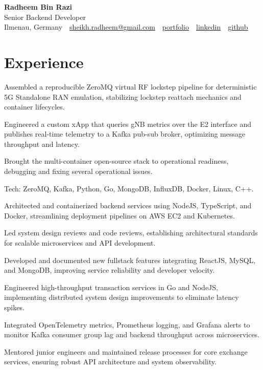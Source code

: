 \documentclass[10pt,a4paper]{resume}
\makeatletter
\newcommand{\Portfolio}{https://radheem.github.io/my-cv}
\newcommand{\PortfolioText}{portfolio}
\newcommand{\GitHub}{https://github.com/radheem}
\newcommand{\LinkedIn}{https://www.linkedin.com/in/radheem-razi}
\newcommand{\Email}{sheikh.radheem@gmail.com}
\makeatother
\begin{document}
\begin{center}
  {\huge\bfseries Radheem Bin Razi}\\[3pt]
  {\large Senior Backend Developer}\\[6pt]
  \small
  Ilmenau, Germany \,\textbar\,
  \href{mailto:\Email}{\Email} \,\textbar\,
  \href{\Portfolio}{\PortfolioText} \,\textbar\,
  \href{\LinkedIn}{linkedin} \,\textbar\,
  \href{\GitHub}{github}
\end{center}
\vspace{2pt}

\section{Experience}

\bullets
  \item Assembled a reproducible ZeroMQ virtual RF lockstep pipeline for deterministic 5G Standalone RAN emulation, stabilizing lockstep reattach mechanics and container lifecycles.
  \item Engineered a custom xApp that queries gNB metrics over the E2 interface and publishes real-time telemetry to a Kafka pub-sub broker, optimizing message throughput and latency.
  \item Brought the multi-container open-source stack to operational readiness, debugging and fixing several operational issues.
  \item Tech: ZeroMQ, Kafka, Python, Go, MongoDB, InfluxDB, Docker, Linux, C++.
\bulletsend
\vspace{1.5pt}
\bullets
  \item Architected and containerized backend services using NodeJS, TypeScript, and Docker, streamlining deployment pipelines on AWS EC2 and Kubernetes.
  \item Led system design reviews and code reviews, establishing architectural standards for scalable microservices and API development.
  \item Developed and documented new fullstack features integrating ReactJS, MySQL, and MongoDB, improving service reliability and developer velocity.
\bulletsend
\vspace{1.5pt}
\bullets
  \item Engineered high-throughput transaction services in Go and NodeJS, implementing distributed system design improvements to eliminate latency spikes.
  \item Integrated OpenTelemetry metrics, Prometheus logging, and Grafana alerts to monitor Kafka consumer group lag and backend throughput across microservices.
  \item Mentored junior engineers and maintained release processes for core exchange services, ensuring robust API architecture and system observability.
\bulletsend
\vspace{1.5pt}
\end{document}

